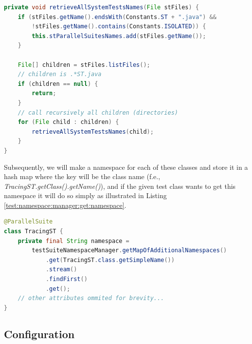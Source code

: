 \begin{lstlisting}[language=Java,label=test:namespace:manager:list:files,caption=Dynamically list all @ParallelSuites,frame=tb]
private void retrieveAllSystemTestsNames(File stFiles) {
    if (stFiles.getName().endsWith(Constants.ST + ".java") &&
        !stFiles.getName().contains(Constants.ISOLATED)) {
        this.stParallelSuitesNames.add(stFiles.getName());
    }

    File[] children = stFiles.listFiles();
    // children is .*ST.java
    if (children == null) {
        return;
    }
    // call recursively all children (directories)
    for (File child : children) {
        retrieveAllSystemTestsNames(child);
    }
}
\end{lstlisting}
Subsequently, we will make a namespace for each of these classes and store it in a hash map where the key will be the class name
(f.e., \emph{TracingST.getClass().getName()}), and if the given test class wants to get this namespace it will do so simply as
illustrated in Listing \ref{test:namespace:manager:get:namespace}.

\begin{lstlisting}[language=Java,label=test:namespace:manager:get:namespace,caption=@ParallelSuite query generated (dynamically) namespace,frame=tb]
@ParallelSuite
class TracingST {
    private final String namespace =
        testSuiteNamespaceManager.getMapOfAdditionalNamespaces()
            .get(TracingST.class.getSimpleName())
            .stream()
            .findFirst()
            .get();
    // other attributes ommited for brevity...
}
\end{lstlisting}

\subsection{Configuration}

